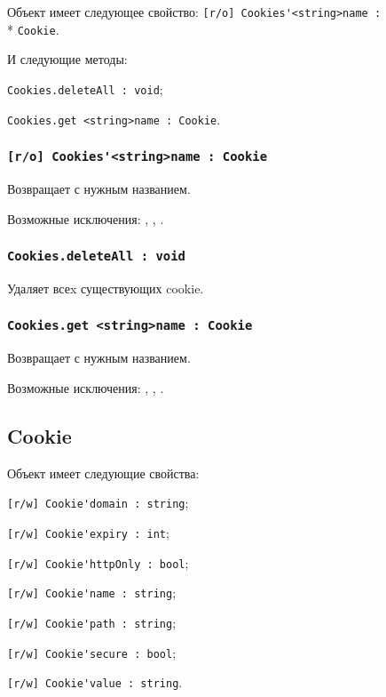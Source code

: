 Объект \cookies{} имеет следующее свойство: \lstinline|[r/o] Cookies'<string>name :|\\* \lstinline|Cookie|.

И следующие методы: 
\begin{icItems}
	\item \lstinline|Cookies.deleteAll : void|;
	\item \lstinline|Cookies.get <string>name : Cookie|.
\end{icItems}

\subsubsection{\lstinline|[r/o] Cookies'<string>name : Cookie|}

Возвращает \cookie{} с нужным названием.

Возможные исключения: , , .

\subsubsection{\lstinline|Cookies.deleteAll : void|}

Удаляет всеx существующих cookie.

\subsubsection{\lstinline|Cookies.get <string>name : Cookie|}

Возвращает \cookie{} с нужным названием.

Возможные исключения: , , .

\subsection{{\color{orange} Cookie}}

Объект \cookie{} имеет следующие свойства:
\begin{icItems}
	\item \lstinline|[r/w] Cookie'domain : string|;
	\item \lstinline|[r/w] Cookie'expiry : int|;
	\item \lstinline|[r/w] Cookie'httpOnly : bool|;
	\item \lstinline|[r/w] Cookie'name : string|;
	\item \lstinline|[r/w] Cookie'path : string|;
	\item \lstinline|[r/w] Cookie'secure : bool|;
	\item \lstinline|[r/w] Cookie'value : string|.
\end{icItems}

